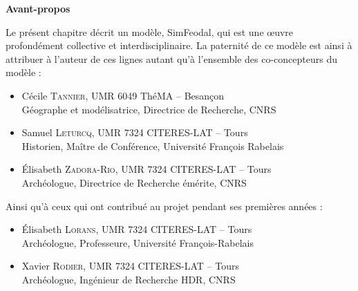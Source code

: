 \begin{mdframed}[backgroundcolor=gray!10,footnoteinside=false]
	\textbf{\hypertarget{avant-propos}{Avant-propos}}\vspace{-.75cm}
	\begin{multicols}{2}
Le présent chapitre décrit un modèle, SimFeodal, qui est une œuvre profondément collective et interdisciplinaire.
La paternité de ce modèle est ainsi à attribuer à l'auteur de ces lignes autant qu'à l'ensemble des co-concepteurs du modèle :
\begin{itemize}
	\item Cécile \textsc{Tannier}, UMR 6049 ThéMA -- Besançon\\
	Géographe et modélisatrice, Directrice de Recherche, CNRS
	\item Samuel \textsc{Leturcq}, UMR 7324 CITERES-LAT -- Tours\\
	Historien, Maître de Conférence, Université François Rabelais
	\item Élisabeth \textsc{Zadora-Rio}, UMR 7324 CITERES-LAT -- Tours\\
	Archéologue, Directrice de Recherche émérite, CNRS
\end{itemize}
Ainsi qu'à ceux qui ont contribué au projet pendant ses premières années :
\begin{itemize}
	\item Élisabeth \textsc{Lorans}, UMR 7324 CITERES-LAT -- Tours\\
	Archéologue, Professeure, Université François-Rabelais
	\item Xavier \textsc{Rodier}, UMR 7324 CITERES-LAT -- Tours\\
	Archéologue, Ingénieur de Recherche HDR, CNRS


\end{itemize}
\end{multicols}
\end{mdframed}
